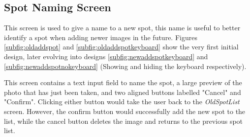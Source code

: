 \subsection{Spot Naming Screen}
This screen is used to give a name to a new spot, this name is useful to better identify a spot when adding newer images in the future. Figures \ref{subfig:oldaddspot} and \ref{subfig:oldaddspotkeyboard} show the very first initial design, later evolving into designs \ref{subfig:newaddspotkeyboard} and \ref{subfig:newaddspotnokeyboard} (Showing and hiding the keyboard respectively).

This screen contains a text input field to name the spot, a large preview of the photo that has just been taken, and two aligned buttons labelled "Cancel" and "Confirm". Clicking either button would take the user back to the \emph{OldSpotList} screen. However, the confirm button would successfully add the new spot to the list, while the cancel button deletes the image and returns to the previous spot list.

